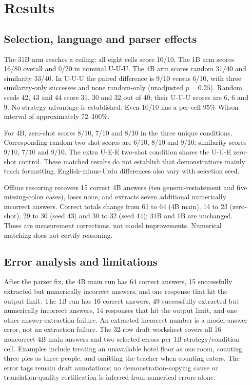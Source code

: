\documentclass[conference]{IEEEtran}
\begin{document}
\section{Results}

\subsection{Selection, language and parser effects}
The 31B arm reaches a ceiling: all eight cells score 10/10. The 1B arm scores 16/80 overall and 0/20 in nominal U-U-U. The 4B arm scores random 31/40 and similarity 33/40. In U-U-U the paired difference is 9/10 versus 6/10, with three similarity-only successes and none random-only (unadjusted $p=0.25$). Random seeds 42, 43 and 44 score 31, 30 and 32 out of 40; their U-U-U scores are 6, 6 and 9. No strategy advantage is established. Even 10/10 has a per-cell 95\% Wilson interval of approximately 72--100\%.

For 4B, zero-shot scores 8/10, 7/10 and 8/10 in the three unique conditions. Corresponding random two-shot scores are 6/10, 8/10 and 9/10; similarity scores 9/10, 7/10 and 9/10. The extra U-E-E two-shot condition shares the U-U-E zero-shot control. These matched results do not establish that demonstrations mainly teach formatting. English-minus-Urdu differences also vary with selection seed.

Offline rescoring recovers 15 correct 4B answers (ten generic-restatement and five missing-colon cases), loses none, and extracts seven additional numerically incorrect answers. Correct totals change from 61 to 64 (4B main), 14 to 23 (zero-shot), 29 to 30 (seed 43) and 30 to 32 (seed 44); 31B and 1B are unchanged. These are measurement corrections, not model improvements. Numerical matching does not certify reasoning.

\subsection{Error analysis and limitations}
After the parser fix, the 4B main run has 64 correct answers, 15 successfully extracted but numerically incorrect answers, and one response that hit the output limit. The 1B run has 16 correct answers, 49 successfully extracted but numerically incorrect answers, 14 responses that hit the output limit, and one other answer-extraction failure. An extracted incorrect number is a model-answer error, not an extraction failure. The 32-row draft worksheet covers all 16 noncorrect 4B main answers and two selected errors per 1B strategy/condition cell. Examples include treating an unavailable hotel floor as one room, counting three pies as three people, and omitting the teacher when counting eaters. The error tags remain draft annotations; no demonstration-copying cause or translation-quality certification is inferred from numerical errors alone.
\end{document}
